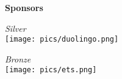 \documentclass[letterpaper,11pt,oneside]{book} %
\begin{document}

\begin{center}
  {\Large \bf Sponsors}
\end{center}

\vspace*{3cm}

\begin{center}
  {\Large \it Silver}\\
  \vspace*{0.5cm}
  \texttt{[image: pics/duolingo.png]}
\end{center}

\vspace*{2cm}

\begin{center}
  {\Large \it Bronze}\\
  \vspace*{0.4cm}
  \texttt{[image: pics/ets.png]} 
\end{center}
\end{document}
